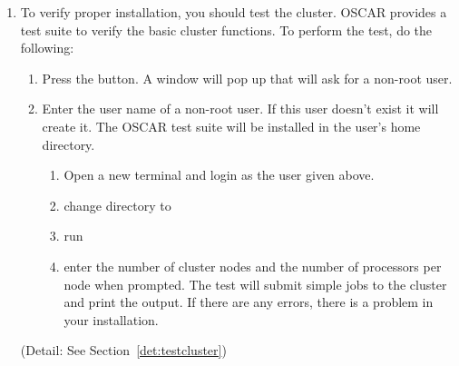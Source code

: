 \begin {enumerate}
  (Detail: See Section~\ref{det:completeinstall})

\item To verify proper installation, you should test the cluster.
  OSCAR provides a test suite to verify the basic cluster functions.
  To perform the test, do the following:

  \begin{enumerate}
  \item Press the  button. A window will
    pop up that will ask for a non-root user.
  \item Enter the user name of a non-root user. If this user doesn't
    exist it will create it. The OSCAR test suite will be installed in
    the user's home directory.
    \begin{enumerate}
    \item Open a new terminal and login as the user given above.
    \item change directory to 
    \item run 
    \item enter the number of cluster nodes and the number of
      processors per node when prompted. The test will submit simple
      jobs to the cluster and print the output. If there are any
      errors, there is a problem in your installation.
    \end{enumerate}
  \end{enumerate}

  (Detail: See Section~\ref{det:testcluster})

\end{enumerate}

